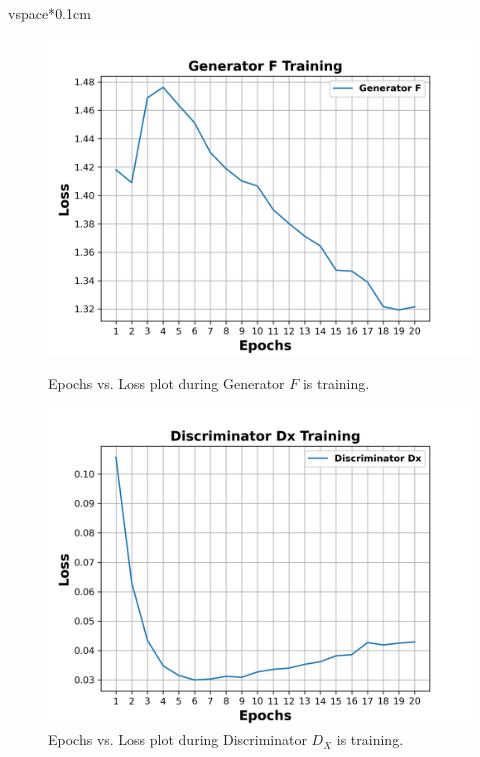 vspace*{0.1cm}
\begin{figure}[H]
  \centering
  \begin{minipage}[b]{0.49\textwidth}
    \includegraphics[width=\textwidth]{images/Evaluation/GeneratorFTraining.png}
    \caption[Epochs vs. Loss plot during Generator $F$ is training.]{Epochs vs. Loss plot during Generator $F$ is training.}
    \label{fig:generatorF}
  \end{minipage}
  \hfill
  \begin{minipage}[b]{0.49\textwidth}
    \includegraphics[width=\textwidth]{images/Evaluation/DiscriminatorDxTraining.png}
    \caption[Epochs vs. Loss plot during Discriminator $D_X$ is training.]{Epochs vs. Loss plot during Discriminator $D_X$ is training.}
    \label{fig:discriminatorDx}
  \end{minipage}
\end{figure}


